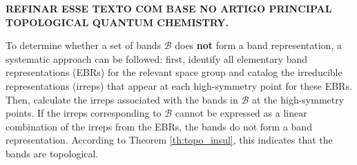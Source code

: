 %
%
%

\textbf{REFINAR ESSE TEXTO COM BASE NO ARTIGO PRINCIPAL TOPOLOGICAL QUANTUM CHEMISTRY.}


To determine whether a set of bands \(\mathcal{B}\) does \textbf{not} form a band representation, a systematic approach can be followed: first, identify all elementary band representations (EBRs) for the relevant space group and catalog the irreducible representations (irreps) that appear at each high-symmetry point for these EBRs. Then, calculate the irreps associated with the bands in \(\mathcal{B}\) at the high-symmetry points. If the irreps corresponding to \(\mathcal{B}\) cannot be expressed as a linear combination of the irreps from the EBRs, the bands do not form a band representation. According to Theorem \ref{th:topo_insul}, this indicates that the bands are topological.

